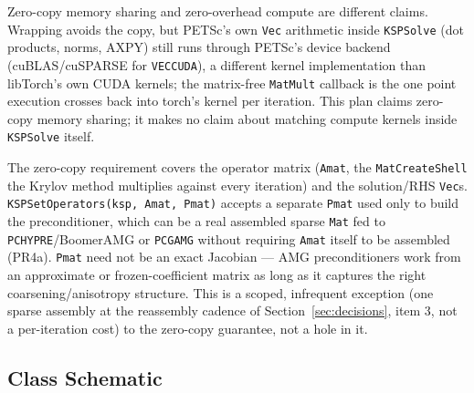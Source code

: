 \documentclass[11pt]{article}
\begin{document}
Zero-copy memory sharing and zero-overhead compute are different claims.
Wrapping avoids the copy, but PETSc's own \texttt{Vec} arithmetic inside
\texttt{KSPSolve} (dot products, norms, AXPY) still runs through PETSc's
device backend (cuBLAS/cuSPARSE for \texttt{VECCUDA}), a different kernel
implementation than libTorch's own CUDA kernels; the matrix-free
\texttt{MatMult} callback is the one point execution crosses back into
torch's kernel per iteration. This plan claims zero-copy memory sharing; it
makes no claim about matching compute kernels inside \texttt{KSPSolve}
itself.

The zero-copy requirement covers the operator matrix (\texttt{Amat},
the \texttt{MatCreateShell} the Krylov method multiplies against every
iteration) and the solution/RHS \texttt{Vec}s. \texttt{KSPSetOperators(ksp,
Amat, Pmat)} accepts a separate \texttt{Pmat} used only to build the
preconditioner, which can be
a real assembled sparse \texttt{Mat} fed to \texttt{PCHYPRE}/BoomerAMG or
\texttt{PCGAMG} without requiring \texttt{Amat} itself to be assembled
(PR4a). \texttt{Pmat} need not be an exact Jacobian --- AMG preconditioners
work from an approximate or frozen-coefficient matrix as long as it
captures the right coarsening/anisotropy structure. This is a scoped,
infrequent exception (one sparse assembly at the reassembly cadence of
Section~\ref{sec:decisions}, item 3, not a per-iteration cost) to the
zero-copy guarantee, not a hole in it.

\subsection{Class Schematic}
\end{document}
